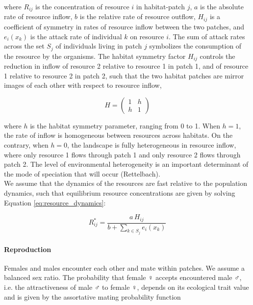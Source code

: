 where $R_{ij}$ is the concentration of resource $i$ in habitat-patch $j$, $a$ is the absolute rate of resource inflow, $b$ is the relative rate of resource outflow, $H_{ij}$ is a coefficient of symmetry in rates of resource inflow between the two patches, and $e_i(x_k)$ is the attack rate of individual $k$ on resource $i$. The sum of attack rates across the set $S_j$ of individuals living in patch $j$ symbolizes the consumption of the resource by the organisms. The habitat symmetry factor $H_{ij}$ controls the reduction in inflow of resource 2 relative to resource 1 in patch 1, and of resource 1 relative to resource 2 in patch 2, such that the two habitat patches are mirror images of each other with respect to resource inflow,

\begin{equation}
    H = 
    \begin{pmatrix} 
        1 & h \\ 
        h & 1
    \end{pmatrix}
\end{equation}

where $h$ is the habitat symmetry parameter, ranging from 0 to 1. When $h = 1$, the rate of inflow is homogeneous between resources across habitats. On the contrary, when $h = 0$, the landscape is fully heterogeneous in resource inflow, where only resource 1 flows through patch 1 and only resource 2 flows through patch 2. The level of environmental heterogeneity is an important determinant of the mode of speciation that will occur (Rettelbach).\\

We assume that the dynamics of the resources are fast relative to the population dynamics, such that equilibrium resource concentrations are given by solving Equation \ref{eq:resource_dynamics}:

\begin{equation}
    R^*_{ij} = \frac{a \, H_{ij}}{b + \sum_{k \in S_j} e_i(x_k)}
\end{equation}

\paragraph{Reproduction} Females and males encounter each other and mate within patches. We assume a balanced sex ratio. The probability that female $\female$ accepts encountered male $\male$, i.e. the attractiveness of male $\male$ to female $\female$, depends on its ecological trait value and is given by the assortative mating probability function

